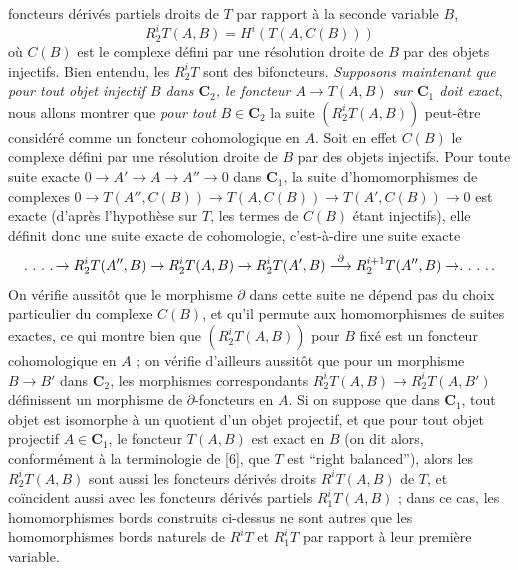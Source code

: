 
\noindent foncteurs dérivés partiels droits de $T$ par rapport à la seconde
variable $B$,
\[
 R_2^iT(A,B)=H^i(T(A,C(B)))
\]
où $C(B)$ est le complexe défini par une résolution droite de $B$ par des
objets injectifs. Bien entendu, les $R_2^iT$ sont des bifoncteurs.
\textit{Supposons maintenant que pour tout objet injectif $B$ dans $\mathbf{C}_2$, le
foncteur $A\to T(A,B)$ sur $\mathbf{C}_1$ doit exact}, nous allons montrer
que \textit{pour tout} $B\in \mathbf{C}_2$ la suite $(R_2^iT(A,B))$ peut-être considéré comme un
foncteur cohomologique en $A$. Soit en effet $C(B)$ le complexe défini par une
résolution droite de $B$ par des objets injectifs. Pour toute suite exacte
$0\to A'\to A\to A''\to0$
dans $\mathbf{C}_1$, la suite d'homomorphismes de complexes
$0\to T(A'',C(B))\to T(A,C(B))
 \to T(A',C(B))\to0$
est exacte (d'après l'hypothèse sur $T$, les termes de $C(B)$ étant injectifs),
elle définit donc une suite exacte de cohomologie, c'est-à-dire une suite
exacte
\[
\ldotp\,\ldotp\,\ldotp\,\ldotp\to R_2^iT(A'',B)\to R_2^iT(A,B)
\to R_2^iT(A',B)
\mathrel{\mathop{\longrightarrow}\limits^{\partial}}R_2^{i+1}T(A'',B)
\to\ldotp\,\ldotp\,\ldotp\,\ldotp .
\]
On vérifie aussitôt que le morphisme $\partial$ dans cette suite ne dépend pas
du choix particulier du complexe $C(B)$, et qu'il permute aux homomorphismes
de suites exactes, ce qui montre bien que $(R_2^iT(A,B))$ pour $B$ fixé est un
foncteur cohomologique en $A$ ; on vérifie d'ailleurs aussitôt que pour un
morphisme $B\to B'$ dans $\mathbf{C}_2$, les morphismes correspondants
$R_2^iT(A,B)\to R_2^iT(A,B')$ définissent un morphisme de
$\partial$-foncteurs en $A$.
Si on suppose que dans $\mathbf{C}_1$, tout objet est isomorphe à un quotient d'un objet
projectif, et que pour tout objet projectif $A\in \mathbf{C}_1$, le foncteur $T(A,B)$
est exact en $B$ (on dit alors, conformément à la terminologie de [6], que $T$
est ``right balanced''), alors les $R_2^iT(A,B)$ sont aussi les foncteurs
dérivés droits $R^iT(A,B)$ de $T$, et coïncident aussi avec les foncteurs
dérivés partiels $R_1^iT(A,B)$ ; dans ce cas, les homomorphismes bords
construits ci-dessus ne sont autres que les homomorphismes bords naturels de
$R^iT$ et $R_1^iT$ par rapport à leur première variable.

